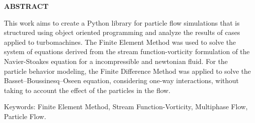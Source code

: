 \begin{center}
\textbf{ABSTRACT}
\end{center}

$\!$\\


This work aims to create a Python library for particle flow simulations that is structured using object oriented programming and analyze the results of cases applied to turbomachines.
The Finite Element Method was used to solve the system of equations derived from the stream function-vorticity formulation of the Navier-Stoakes equation for a incompressible and newtonian fluid.
For the particle behavior modeling, the Finite Difference Method was applied to solve the Basset–Boussinesq–Oseen equation, considering one-way interactions, without taking to account the effect of the particles in the flow.

\vspace{1cm}

\hspace{-1.3cm}Keywords: Finite Element Method, Stream Function-Vorticity, Multiphase Flow, Particle Flow.